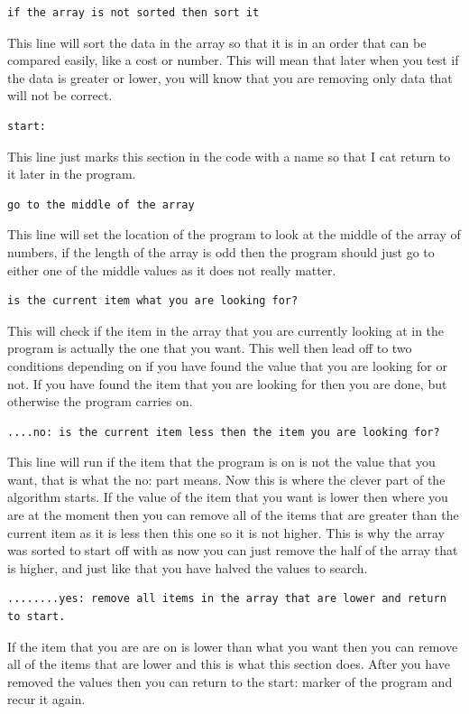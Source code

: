\documentclass{article}
\begin{document}
\begin{verbatim}
if the array is not sorted then sort it
\end{verbatim}
This line will sort the data in the array so that it is in an order that can be compared easily, like a cost or number. This will mean that later when you test if the data is greater or lower, you will know that you are removing only data that will not be correct. 

\begin{verbatim}
start:
\end{verbatim}
This line just marks this section in the code with a name so that I cat return to it later in the program. 

\begin{verbatim}
go to the middle of the array 
\end{verbatim}
This line will set the location of the program to look at the middle of the array of numbers, if the length of the array is odd then the program should just go to either one of the middle values as it does not really matter. 

\begin{verbatim}
is the current item what you are looking for?
\end{verbatim}
This will check if the item in the array that you are currently looking at in the program is actually the one that you want. This well then lead off to two conditions depending on if you have found the value that you are looking for or not. If you have found the item that you are looking for then you are done, but otherwise the program carries on. 

\begin{verbatim}
....no: is the current item less then the item you are looking for?
\end{verbatim}
This line will run if the item that the program is on is not the value that you want, that is what the no: part means. Now this is where the clever part of the algorithm starts. If the value of the item that you want is lower then where you are at the moment then you can remove all of the items that are greater than the current item as it is less then this one so it is not higher. This is why the array was sorted to start off with as now you can just remove the half of the array that is higher, and just like that you have halved the values to search. 

\begin{verbatim}
........yes: remove all items in the array that are lower and return to start.
\end{verbatim}
If the item that you are are on is lower than what you want then you can remove all of the items that are lower and this is what this section does. After you have removed the values then you can return to the start: marker of the program and recur it again. 
\end{document}
